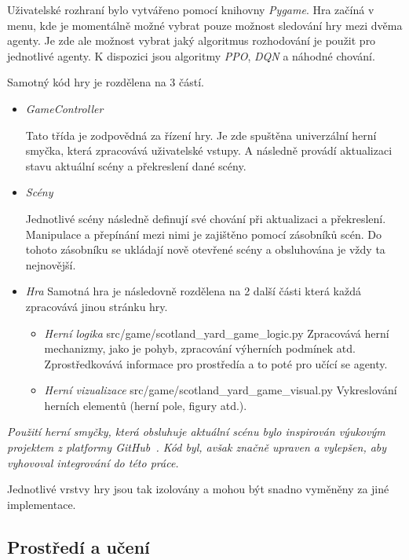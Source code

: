 Uživatelské rozhraní bylo vytvářeno pomocí knihovny \emph{Pygame}.
Hra začíná v menu, kde je momentálně možné vybrat pouze možnost sledování hry mezi dvěma agenty.
Je zde ale možnost vybrat jaký algoritmus rozhodování je použit pro jednotlivé agenty.
K dispozici jsou algoritmy \emph{PPO}, \emph{DQN} a náhodné chování.

Samotný kód hry je rozdělena na 3 částí.

\begin{itemize}
  \item \emph{GameController}~\cite{GameSceneController}
  
  Tato třída je zodpovědná za řízení hry.
  Je zde spuštěna univerzální herní smyčka, která zpracovává uživatelské vstupy.
  A následně provádí aktualizaci stavu aktuální scény a překreslení dané scény.
  \item \emph{Scény}~\cite{GameSceneController}
  
  Jednotlivé scény následně definují své chování při aktualizaci a překreslení.
  Manipulace a přepínání mezi nimi je zajištěno pomocí zásobníků scén.
  Do tohoto zásobníku se ukládají nově otevřené scény a obsluhována je vždy ta nejnovější.

  \item \emph{Hra}
    Samotná hra je následovně rozdělena na 2 další části která každá zpracovává jinou stránku hry.
    \begin{itemize}
      \item \emph{Herní logika} src/game/scotland\_yard\_game\_logic.py
      Zpracovává herní mechanizmy, jako je pohyb, zpracování výherních podmínek atd.
      Zprostředkovává informace pro prostředía a to poté pro učící se agenty.

      \item \emph{Herní vizualizace}  src/game/scotland\_yard\_game\_visual.py
      Vykreslování herních elementů (herní pole, figury atd.).
    \end{itemize}
\end{itemize}

\textit{Použití herní smyčky, která obsluhuje aktuální scénu bylo inspirován výukovým projektem z platformy GitHub~\cite{GameSceneController}.
Kód byl, avšak značně upraven a vylepšen, aby vyhovoval integrování do této práce.}

Jednotlivé vrstvy hry jsou tak izolovány a mohou být snadno vyměněny za jiné implementace.

\subsection{Prostředí a učení}\label{subsec:prostredi}

